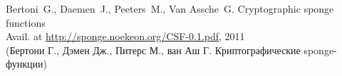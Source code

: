\clearpage
\begin{thebibliography}{9}

Bertoni~G., Daemen~J., Peeters~M., Van Assche~G. 
Cryptographic sponge functions\\
{\small Avail. at \url{http://sponge.noekeon.org/CSF-0.1.pdf}, 2011}\\
{\small (Бертони Г., Дэмен Дж., Питерс М., ван Аш Г. Криптографические 
sponge-функции)}

\end{thebibliography}

